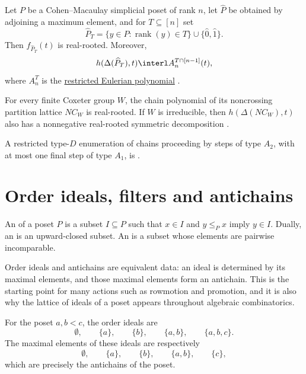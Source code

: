\begin{theorem}
Let $P$ be a Cohen--Macaulay simplicial poset of rank $n$, let $\widehat P$
be obtained by adjoining a maximum element, and for $T\subseteq[n]$ set
\[
 \widehat P_T=\{y\in P:\operatorname{rank}(y)\in T\}
 \cup\{\widehat0,\widehat1\}.
\]
Then $f_{\widehat P_T}(t)$ is real-rooted.  Moreover,
\[
 h(\Delta(\widehat P_T),t)
 \interl A_n^{T\cap[n-1]}(t),
\]
where $A_n^T$ is the
\hyperref[restrictedEulerianPolynomial]{restricted Eulerian polynomial}
\cite[Thm.~1.2]{AthanasiadisDouvropoulosKalampogiaEvangelinou2024}.

For every finite Coxeter group $W$, the chain polynomial of its noncrossing
partition lattice $NC_W$ is real-rooted.  If $W$ is irreducible, then
$h(\Delta(NC_W),t)$ also has a nonnegative real-rooted symmetric
decomposition
\cite[Thm.~1.3]{AthanasiadisDouvropoulosKalampogiaEvangelinou2024}.
\end{theorem}

A restricted type-$D$ enumeration of chains proceeding by steps of type
$A_2$, with at most one final step of type $A_1$, is .

\section[posetIdeals]{Order ideals, filters and antichains}

An \label{orderIdeal} of a poset $P$ is a subset
$I\subseteq P$ such that $x\in I$ and $y\leq_P x$ imply $y\in I$.  Dually, an
\label{orderFilter} is an upward-closed subset.  An
 is a subset whose elements are pairwise incomparable.

Order ideals and antichains are equivalent data: an ideal is determined by
its maximal elements, and those maximal elements form an antichain.  This is
the starting point for many actions such as rowmotion and promotion, and it is
also why the lattice of ideals of a poset appears throughout algebraic
combinatorics.

\begin{example*}
For the poset $a,b\lt c$, the order ideals are
\[
  \emptyset,\qquad \{a\},\qquad \{b\},\qquad \{a,b\},\qquad \{a,b,c\}.
\]
The maximal elements of these ideals are respectively
\[
  \emptyset,\qquad \{a\},\qquad \{b\},\qquad \{a,b\},\qquad \{c\},
\]
which are precisely the antichains of the poset.
\end{example*}

